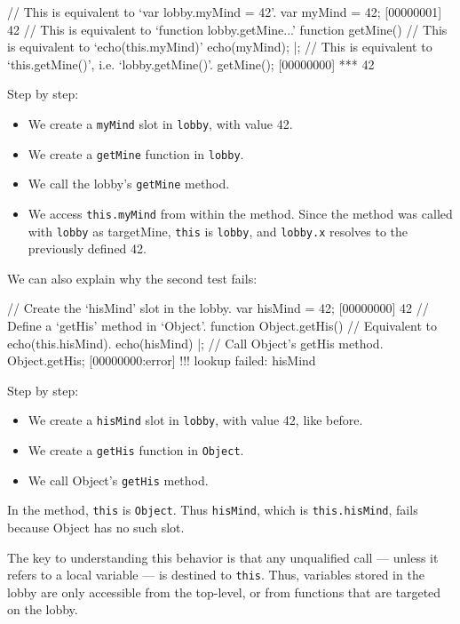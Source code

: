 \begin{urbiscript}
// This is equivalent to `var lobby.myMind = 42'.
var myMind = 42;
[00000001] 42
// This is equivalent to `function lobby.getMine...'
function getMine()
{
  // This is equivalent to `echo(this.myMind)'
  echo(myMind);
}|;
// This is equivalent to `this.getMine()', i.e. `lobby.getMine()'.
getMine();
[00000000] *** 42
\end{urbiscript}

Step by step:
\begin{itemize}
\item We create a \lstinline|myMind| slot in \lstinline|lobby|, with
  value 42.
\item We create a \lstinline|getMine| function in \lstinline|lobby|.
\item We call the lobby's \lstinline|getMine| method.
\item We access \lstinline|this.myMind| from within the method. Since
  the method was called with \lstinline|lobby| as targetMine,
  \lstinline|this| is \lstinline|lobby|, and \lstinline|lobby.x|
  resolves to the previously defined 42.
\end{itemize}

We can also explain why the second test fails:

\begin{urbiscript}
// Create the `hisMind' slot in the lobby.
var hisMind = 42;
[00000000] 42
// Define a `getHis' method in `Object'.
function Object.getHis()
{
  // Equivalent to echo(this.hisMind).
  echo(hisMind)
}|;
// Call Object's getHis method.
Object.getHis;
[00000000:error] !!! lookup failed: hisMind
\end{urbiscript}

Step by step:
\begin{itemize}
\item We create a \lstinline|hisMind| slot in \lstinline|lobby|, with
  value 42, like before.
\item We create a \lstinline|getHis| function in \lstinline|Object|.
\item We call Object's \lstinline|getHis| method.
\end{itemize}

In the method, \lstinline|this| is \lstinline|Object|. Thus
\lstinline|hisMind|, which is \lstinline|this.hisMind|, fails because
Object has no such slot.

The key to understanding this behavior is that any unqualified call
--- unless it refers to a local variable --- is destined to
\lstinline|this|. Thus, variables stored in the lobby are only
accessible from the top-level, or from functions that are targeted on
the lobby.

